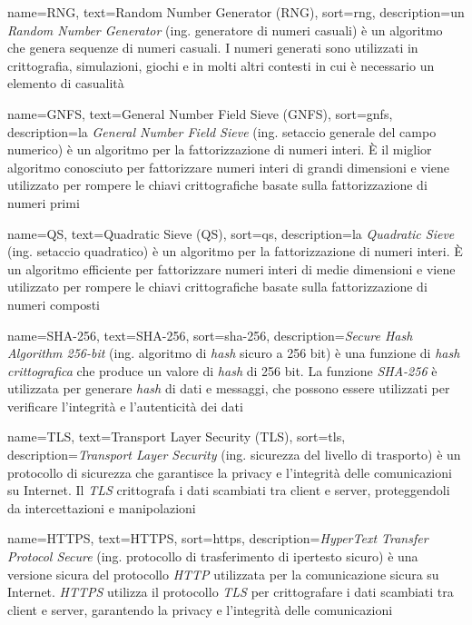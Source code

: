  {
    name=RNG,
    text=Random Number Generator (RNG),
    sort=rng,
    description={un \emph{Random Number Generator} (ing. generatore di numeri casuali) è un algoritmo che genera sequenze di numeri casuali. I numeri generati sono utilizzati in crittografia, simulazioni, giochi e in molti altri contesti in cui è necessario un elemento di casualità}
}

 {
    name=GNFS,
    text=General Number Field Sieve (GNFS),
    sort=gnfs,
    description={la \emph{General Number Field Sieve} (ing. setaccio generale del campo numerico) è un algoritmo per la fattorizzazione di numeri interi. È il miglior algoritmo conosciuto per fattorizzare numeri interi di grandi dimensioni e viene utilizzato per rompere le chiavi crittografiche basate sulla fattorizzazione di numeri primi}
}

 {
    name=QS,
    text=Quadratic Sieve (QS),
    sort=qs,
    description={la \emph{Quadratic Sieve} (ing. setaccio quadratico) è un algoritmo per la fattorizzazione di numeri interi. È un algoritmo efficiente per fattorizzare numeri interi di medie dimensioni e viene utilizzato per rompere le chiavi crittografiche basate sulla fattorizzazione di numeri composti}
}

 {
    name=SHA-256,
    text=SHA-256,
    sort=sha-256,
    description={\emph{Secure Hash Algorithm 256-bit} (ing. algoritmo di \emph{hash} sicuro a 256 bit) è una funzione di \emph{hash crittografica} che produce un valore di \emph{hash} di 256 bit. La funzione \emph{SHA-256} è utilizzata per generare \emph{hash} di dati e messaggi, che possono essere utilizzati per verificare l'integrità e l'autenticità dei dati}
}

 {
    name=TLS,
    text=Transport Layer Security (TLS),
    sort=tls,
    description={\emph{Transport Layer Security} (ing. sicurezza del livello di trasporto) è un protocollo di sicurezza che garantisce la privacy e l'integrità delle comunicazioni su Internet. Il \emph{TLS} crittografa i dati scambiati tra client e server, proteggendoli da intercettazioni e manipolazioni}
}

 {
    name=HTTPS,
    text=HTTPS,
    sort=https,
    description={\emph{HyperText Transfer Protocol Secure} (ing. protocollo di trasferimento di ipertesto sicuro) è una versione sicura del protocollo \emph{HTTP} utilizzata per la comunicazione sicura su Internet. \emph{HTTPS} utilizza il protocollo \emph{TLS} per crittografare i dati scambiati tra client e server, garantendo la privacy e l'integrità delle comunicazioni}
}

